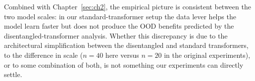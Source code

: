 \documentclass[11pt,a4paper]{article}
\begin{document}
Combined with Chapter~\ref{sec:ch2}, the empirical picture is consistent
between the two model scales: in our standard-transformer setup the data
lever helps the model learn faster but does not produce the OOD benefits
predicted by the disentangled-transformer analysis. Whether this
discrepancy is due to the architectural simplification between the
disentangled and standard transformers, to the difference in scale
($n = 40$ here versus $n = 20$ in the original experiments), or to some
combination of both, is not something our experiments can directly settle.
\end{document}
